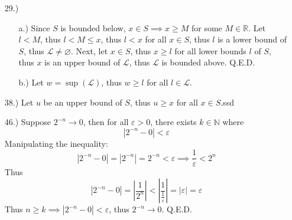 \documentclass[12pt]{article}
\newcommand{\vertb}[1]{\left\vert#1\right\vert}
\newcommand{\e}{\varepsilon}
\begin{document}
\pagestyle{fancy}
\fancyhead{}

\normalsize
\begin{itemize}

    \item [29.)] \begin{itemize}
        \item [a.)] Since $S$ is bounded below, $x\in S\implies x\geq M$ for some $M\in\mathbb{R}$. Let $l<M$, thus $l<M\leq x$, thus $l<x$ for all $x\in S$, thus $l$ is a lower bound of $S$, thus $\mathscr{L}\ne\varnothing$. Next, let $x\in S$, thus $x\geq l$ for all lower bounds $l$ of $S$, thus $x$ is an upper bound of $\mathscr{L}$, thus $\mathscr{L}$ is bounded above. Q.E.D.

        \item [b.)] Let $w=\sup(\mathscr{L})$, thus $w\geq l$ for all $l\in\mathscr{L}$.
    \end{itemize}



    \item [38.)] Let $u$ be an upper bound of $S$, thus $u\geq x$ for all $x\in S$.ssd


    \item [46.)] Suppose $2^{-n}\to0$, then for all $\e>0$, there exists $k\in\mathbb{N}$ where
    \[\vertb{2^{-n}-0}<\e\]
    Manipulating the inequality:
    \[\vertb{2^{-n}-0}=\vertb{2^{-n}}=2^{-n}<\e\implies\frac{1}{\e}<2^n\]
    Thus
    \[\vertb{2^{-n}-0}=\vertb{\frac{1}{2^n}}<\vertb{\frac{1}{\frac{1}{\e}}}=\vertb{\e}=\e\]
    Thus $n\geq k\implies\vertb{2^{-n}-0}<\e$, thus $2^{-n}\to0$. Q.E.D.


\end{itemize}
\end{document}
